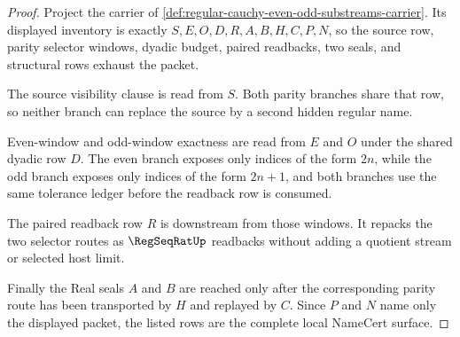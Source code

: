 \begin{proof}
Project the carrier of \autoref{def:regular-cauchy-even-odd-substreams-carrier}. Its displayed inventory is exactly $S,E,O,D,R,A,B,H,C,P,N$, so the source row, parity selector windows, dyadic budget, paired readbacks, two seals, and structural rows exhaust the packet.

The source visibility clause is read from $S$. Both parity branches share that row, so neither branch can replace the source by a second hidden regular name.

Even-window and odd-window exactness are read from $E$ and $O$ under the shared dyadic row $D$. The even branch exposes only indices of the form $2n$, while the odd branch exposes only indices of the form $2n+1$, and both branches use the same tolerance ledger before the readback row is consumed.

The paired readback row $R$ is downstream from those windows. It repacks the two selector routes as $\RegSeqRatUp$ readbacks without adding a quotient stream or selected host limit.

Finally the Real seals $A$ and $B$ are reached only after the corresponding parity route has been transported by $H$ and replayed by $C$. Since $P$ and $N$ name only the displayed packet, the listed rows are the complete local NameCert surface.
\end{proof}

